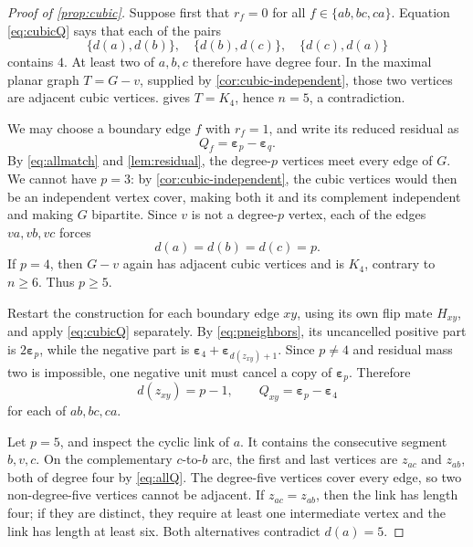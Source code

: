 \documentclass[11pt]{article}
\theoremstyle{definition}
\theoremstyle{remark}
\newcommand{\eps}{\boldsymbol\varepsilon}
\begin{document}
\begin{proof}[Proof of \cref{prop:cubic}]
Suppose first that \(r_f=0\) for all \(f\in\{ab,bc,ca\}\).  Equation
\eqref{eq:cubicQ} says that each of the pairs
\[
           \{d(a),d(b)\},\quad \{d(b),d(c)\},\quad \{d(c),d(a)\}
\]
contains \(4\).  At least two of \(a,b,c\) therefore have degree four.
In the maximal planar graph \(T=G-v\), supplied by
\cref{cor:cubic-independent}, those two vertices are adjacent cubic
vertices.   gives \(T=K_4\), hence \(n=5\), a
contradiction.

We may choose a boundary edge \(f\) with \(r_f=1\), and write its reduced
residual as
\[
                         Q_f=\eps_p-\eps_q.          \tag{E.3}\label{eq:massone}
\]
By \eqref{eq:allmatch} and \cref{lem:residual}, the degree-\(p\) vertices
meet every edge of \(G\).  We cannot have \(p=3\): by
\cref{cor:cubic-independent}, the cubic vertices would then be an independent
vertex cover, making both it and its complement independent and making
\(G\) bipartite.  Since \(v\) is not a degree-\(p\) vertex, each of the
edges \(va,vb,vc\) forces
\[
                         d(a)=d(b)=d(c)=p.           \tag{E.4}\label{eq:pneighbors}
\]
If \(p=4\), then \(G-v\) again has adjacent cubic vertices and is \(K_4\),
contrary to \(n\ge6\).  Thus \(p\ge5\).

Restart the construction for each boundary edge \(xy\), using its own flip
mate \(H_{xy}\), and apply \eqref{eq:cubicQ} separately.  By
\eqref{eq:pneighbors}, its uncancelled positive part is \(2\eps_p\), while
the negative part is \(\eps_4+\eps_{d(z_{xy})+1}\).  Since \(p\ne4\) and
residual mass two is impossible, one negative unit must cancel a copy of
\(\eps_p\).  Therefore
\[
       d(z_{xy})=p-1,
       \qquad Q_{xy}=\eps_p-\eps_4                  \tag{E.5}\label{eq:allQ}
\]
for each of \(ab,bc,ca\).

Let \(p=5\), and inspect the cyclic link of \(a\).  It contains the
consecutive segment \(b,v,c\).  On the complementary \(c\)-to-\(b\) arc,
the first and last vertices are \(z_{ac}\) and \(z_{ab}\), both of degree
four by \eqref{eq:allQ}.  The degree-five vertices cover every edge, so two
non-degree-five vertices cannot be adjacent.  If
\(z_{ac}=z_{ab}\), then the link has length four; if they are distinct,
they require at least one intermediate vertex and the link has length at
least six.  Both alternatives contradict \(d(a)=5\).


\end{proof}
\end{document}
